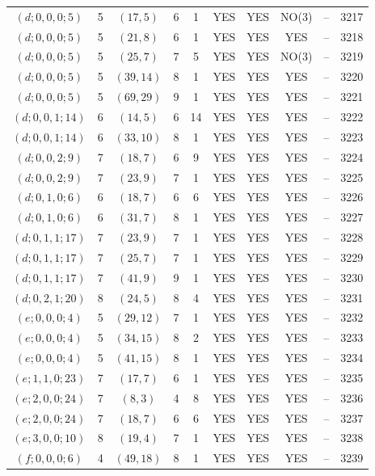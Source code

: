 \begin{longtable}{|c|c|c|c|c|c|c|c|c|c|}
$(d; 0, 0, 0; 5)$ & 5 & $(17, 5)$ & 6 & 1 & YES & YES & NO(3) & -- & 3217\\
$(d; 0, 0, 0; 5)$ & 5 & $(21, 8)$ & 6 & 1 & YES & YES & YES & -- & 3218\\
$(d; 0, 0, 0; 5)$ & 5 & $(25, 7)$ & 7 & 5 & YES & YES & NO(3) & -- & 3219\\
$(d; 0, 0, 0; 5)$ & 5 & $(39, 14)$ & 8 & 1 & YES & YES & YES & -- & 3220\\
$(d; 0, 0, 0; 5)$ & 5 & $(69, 29)$ & 9 & 1 & YES & YES & YES & -- & 3221\\
$(d; 0, 0, 1; 14)$ & 6 & $(14, 5)$ & 6 & 14 & YES & YES & YES & -- & 3222\\
$(d; 0, 0, 1; 14)$ & 6 & $(33, 10)$ & 8 & 1 & YES & YES & YES & -- & 3223\\
$(d; 0, 0, 2; 9)$ & 7 & $(18, 7)$ & 6 & 9 & YES & YES & YES & -- & 3224\\
$(d; 0, 0, 2; 9)$ & 7 & $(23, 9)$ & 7 & 1 & YES & YES & YES & -- & 3225\\
$(d; 0, 1, 0; 6)$ & 6 & $(18, 7)$ & 6 & 6 & YES & YES & YES & -- & 3226\\
$(d; 0, 1, 0; 6)$ & 6 & $(31, 7)$ & 8 & 1 & YES & YES & YES & -- & 3227\\
$(d; 0, 1, 1; 17)$ & 7 & $(23, 9)$ & 7 & 1 & YES & YES & YES & -- & 3228\\
$(d; 0, 1, 1; 17)$ & 7 & $(25, 7)$ & 7 & 1 & YES & YES & YES & -- & 3229\\
$(d; 0, 1, 1; 17)$ & 7 & $(41, 9)$ & 9 & 1 & YES & YES & YES & -- & 3230\\
$(d; 0, 2, 1; 20)$ & 8 & $(24, 5)$ & 8 & 4 & YES & YES & YES & -- & 3231\\
$(e; 0, 0, 0; 4)$ & 5 & $(29, 12)$ & 7 & 1 & YES & YES & YES & -- & 3232\\
$(e; 0, 0, 0; 4)$ & 5 & $(34, 15)$ & 8 & 2 & YES & YES & YES & -- & 3233\\
$(e; 0, 0, 0; 4)$ & 5 & $(41, 15)$ & 8 & 1 & YES & YES & YES & -- & 3234\\
$(e; 1, 1, 0; 23)$ & 7 & $(17, 7)$ & 6 & 1 & YES & YES & YES & -- & 3235\\
$(e; 2, 0, 0; 24)$ & 7 & $(8, 3)$ & 4 & 8 & YES & YES & YES & -- & 3236\\
$(e; 2, 0, 0; 24)$ & 7 & $(18, 7)$ & 6 & 6 & YES & YES & YES & -- & 3237\\
$(e; 3, 0, 0; 10)$ & 8 & $(19, 4)$ & 7 & 1 & YES & YES & YES & -- & 3238\\
$(f; 0, 0, 0; 6)$ & 4 & $(49, 18)$ & 8 & 1 & YES & YES & YES & -- & 3239\\

\end{longtable}
